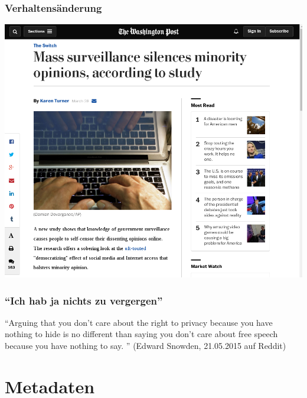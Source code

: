 \documentclass[12pt]{beamer}
\begin{document}
\begin{frame}
  \frametitle{Verhaltensänderung}
  \begin{center}
    \includegraphics[height=0.7\textheight]{img/verhalten.png}
  \end{center}
\end{frame}

\begin{frame}
    \frametitle{``Ich hab ja nichts zu vergergen''}
    \pause
    \begin{center}
      ``Arguing that you don't care about the right to privacy because you have nothing to hide is no different than saying you don't care about free speech because you have nothing to say. ''
      (Edward Snowden, 21.05.2015 auf Reddit)
    \end{center}
\end{frame}

\section{Metadaten}
\subsection{}
\end{document}
